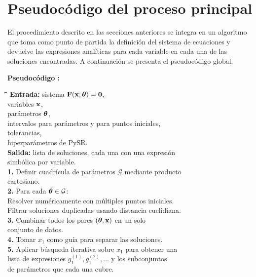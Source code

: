 \section{Pseudocódigo del proceso principal} \label{sec:pseudocodigo_principal}

El procedimiento descrito en las secciones anteriores se integra en un algoritmo que toma como punto de partida la definición del sistema de ecuaciones y devuelve las expresiones analíticas para cada variable en cada una de las soluciones encontradas. A continuación se presenta el pseudocódigo global.

\medskip {}\label{alg:proceso_principal} \noindent\textbf{Pseudocódigo \thepseudocode:} \begin{tabbing} \qquad \= \qquad \= \qquad \= \kill
\textbf{Entrada:} \>\>\> sistema \(\mathbf{F}(\mathbf{x}; \boldsymbol{\theta}) = \mathbf{0}\), \\
\>\>\> variables \(\mathbf{x}\), \\
\>\>\> parámetros \(\boldsymbol{\theta}\), \\
\>\>\> intervalos para parámetros y para puntos iniciales, \\
\>\>\> tolerancias, \\
\>\>\> hiperparámetros de PySR. \\
\textbf{Salida:} \>\>\> lista de soluciones, cada una con una expresión \\
\>\>\> simbólica por variable. \\[4pt]
\textbf{1.} \> Definir cuadrícula de parámetros \(\mathcal{G}\) mediante producto \\
\> cartesiano. \\
\textbf{2.} \> Para cada \(\boldsymbol{\theta} \in \mathcal{G}\): \\
\> \qquad Resolver numéricamente con múltiples puntos iniciales. \\
\> \qquad Filtrar soluciones duplicadas usando distancia euclidiana. \\
\textbf{3.} \> Combinar todos los pares \((\boldsymbol{\theta}, \mathbf{x})\) en un solo \\
\> conjunto de datos. \\
\textbf{4.} \> Tomar \(x_1\) como guía para separar las soluciones. \\
\textbf{5.} \> Aplicar búsqueda iterativa sobre \(x_1\) para obtener una \\
\> lista de expresiones \(g_1^{(1)}, g_1^{(2)}, \dots\) y los subconjuntos \\
\> de parámetros que cada una cubre. \\

\end{tabbing}
